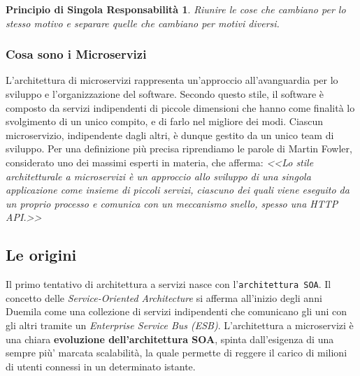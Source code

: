 \newtheorem{defin}{Principio di Singola Responsabilità}
\begin{defin}
    Riunire le cose che cambiano per lo stesso motivo e separare quelle che cambiano per motivi diversi.
\end{defin}

\subsubsection{Cosa sono i Microservizi}
L'architettura di microservizi rappresenta un'approccio all'avanguardia per lo sviluppo e l'organizzazione del software. Secondo questo stile, il software è composto da servizi indipendenti di piccole dimensioni che hanno come finalità lo svolgimento di un unico compito, e di farlo nel migliore dei modi. \cite{amazon:microservices} Ciascun microservizio, indipendente dagli altri, è dunque gestito da un unico team di sviluppo. Per una definizione più precisa riprendiamo le parole di Martin Fowler, considerato uno dei massimi esperti in materia, che afferma: \textit{<<Lo stile architetturale a microservizi è un approccio allo sviluppo di una singola applicazione come insieme di piccoli servizi, ciascuno dei quali viene eseguito da un proprio processo e comunica con un meccanismo snello, spesso una HTTP API.>>} \cite{fowler:microservices}

\subsection{Le origini}
Il primo tentativo di architettura a servizi nasce con l’\texttt{architettura SOA}. Il concetto delle \textit{Service-Oriented Architecture} si afferma all’inizio degli anni Duemila come una collezione di servizi indipendenti che comunicano gli uni con gli altri tramite un \textit{Enterprise Service Bus (ESB)}. L’architettura a microservizi è una chiara \textbf{evoluzione dell’architettura SOA}, spinta dall’esigenza  di una sempre più’ marcata scalabilità, la quale permette di reggere il carico di milioni di utenti connessi in un determinato istante.

